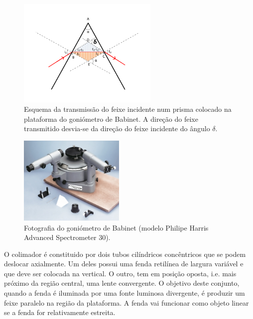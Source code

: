 \documentclass[a4paper,12pt]{article}  %
\begin{document}
\begin{figure}[tb]  \centering 
	\includegraphics[width=0.6\textwidth]{desvio}
	\caption{Esquema da transmissão do feixe incidente num prisma colocado na plataforma do goniómetro de Babinet. A direção do feixe transmitido desvia-se da direção do feixe incidente do ângulo $\delta$. \label{fig:desvio}} 
\end{figure}

\begin{figure}[tb]  
\centering 
	\includegraphics[width=0.45\textwidth]{spectrometer}
	\caption{Fotografia do goniómetro de Babinet (modelo Philipe Harris Advanced Spectrometer 30). \label{fig:spectrometer}} 
\end{figure}

O colimador é constituido por dois tubos cilíndricos concêntricos que se podem deslocar axialmente. Um deles possui uma fenda retilínea de largura variável e que deve ser colocada na vertical. O outro, tem em posição oposta, i.e. mais próximo da região central, uma lente convergente. O objetivo deste conjunto, quando a fenda é iluminada por uma fonte luminosa divergente, é produzir um feixe paralelo na região da plataforma. A fenda vai funcionar como objeto linear se a fenda for relativamente estreita.
\end{document}
